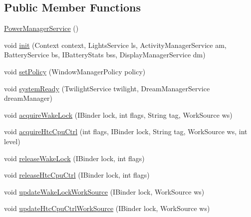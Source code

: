\subsection*{Public Member Functions}
\begin{DoxyCompactItemize}
\item 
\hyperlink{classcom_1_1android_1_1server_1_1power_1_1PowerManagerService_af61f43046957912e62237da840197b84}{Power\-Manager\-Service} ()
\item 
void \hyperlink{classcom_1_1android_1_1server_1_1power_1_1PowerManagerService_af4ef6caf8d8906988b32470167669ec6}{init} (Context context, Lights\-Service ls, Activity\-Manager\-Service am, Battery\-Service bs, I\-Battery\-Stats bss, Display\-Manager\-Service dm)
\item 
void \hyperlink{classcom_1_1android_1_1server_1_1power_1_1PowerManagerService_a9c258b7f4cfc587dfda695b47f75be9e}{set\-Policy} (Window\-Manager\-Policy policy)
\item 
void \hyperlink{classcom_1_1android_1_1server_1_1power_1_1PowerManagerService_a99479445bbbc687684f583c69a9ba39b}{system\-Ready} (Twilight\-Service twilight, Dream\-Manager\-Service dream\-Manager)
\item 
void \hyperlink{classcom_1_1android_1_1server_1_1power_1_1PowerManagerService_afeb6fabbab5aed353735777a05becf3f}{acquire\-Wake\-Lock} (I\-Binder lock, int flags, String tag, Work\-Source ws)
\item 
void \hyperlink{classcom_1_1android_1_1server_1_1power_1_1PowerManagerService_a92faede593a057488165d627041ee2c2}{acquire\-Htc\-Cpu\-Ctrl} (int flags, I\-Binder lock, String tag, Work\-Source ws, int level)
\item 
void \hyperlink{classcom_1_1android_1_1server_1_1power_1_1PowerManagerService_ab74ce4c78bc9df9d5a2af05a511487cb}{release\-Wake\-Lock} (I\-Binder lock, int flags)
\item 
void \hyperlink{classcom_1_1android_1_1server_1_1power_1_1PowerManagerService_accfbc813d8ba64b9672c5053862013f8}{release\-Htc\-Cpu\-Ctrl} (I\-Binder lock, int flags)
\item 
void \hyperlink{classcom_1_1android_1_1server_1_1power_1_1PowerManagerService_acc2cb88d3e5e70d961b404a2a7bb0483}{update\-Wake\-Lock\-Work\-Source} (I\-Binder lock, Work\-Source ws)
\item 
void \hyperlink{classcom_1_1android_1_1server_1_1power_1_1PowerManagerService_a1cf4fcda2fc126a0e8f7a1fed9f03574}{update\-Htc\-Cpu\-Ctrl\-Work\-Source} (I\-Binder lock, Work\-Source ws)
\item 

\end{DoxyCompactItemize}
